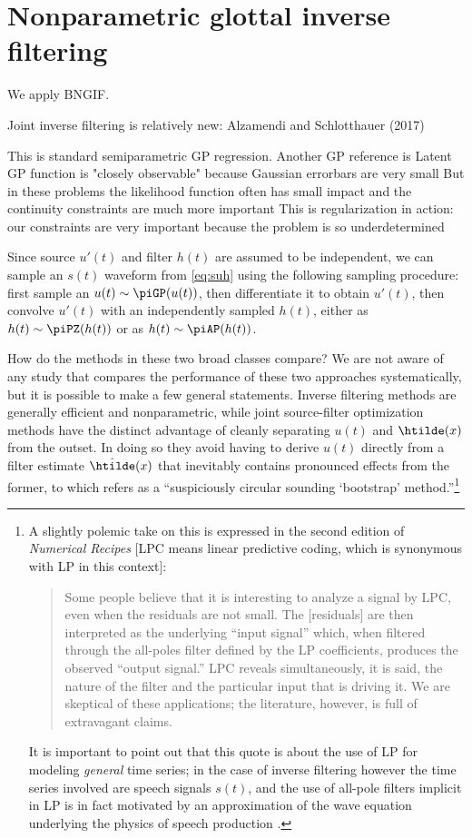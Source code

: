 \chapter{Nonparametric glottal inverse filtering\label{chapter:6}}

\begin{chaptersections}{%
We apply BNGIF.
}

Joint inverse filtering is relatively new: Alzamendi and Schlotthauer (2017)

This is standard semiparametric GP regression.
Another GP reference is \citep{MacKay1998}
Latent GP function is "closely observable" because Gaussian errorbars are very small
But in these problems the likelihood function often has small impact \citep{Murray2010a} and the continuity constraints are much more important
This is regularization in action: our constraints are very important because the problem is so underdetermined


Since source $u'(t)$ and filter $h(t)$ are assumed to be independent, we can sample an $s(t)$ waveform from \eqref{eq:suh} using the following sampling procedure: first sample an $u(t) \sim \piGP(u(t))$, then differentiate it to obtain $u'(t)$, then convolve $u'(t)$ with an independently sampled $h(t)$, either as $h(t) \sim \piPZ(h(t))$ or as $h(t) \sim \piAP(h(t))$.

How do the methods in these two broad classes compare?
We are not aware of any study that compares the performance of these two approaches systematically, but it is possible to make a few general statements.
Inverse filtering methods are generally efficient and nonparametric, while joint source-filter optimization methods have the distinct advantage of cleanly separating $u(t)$ and $\htilde(x)$ from the outset.
In doing so they avoid having to derive $u(t)$ directly from a filter estimate $\hat\htilde(x)$ that inevitably contains pronounced effects from the former, to which \cite[][p.~94]{Schroeder1999} refers as a ``suspiciously circular sounding `bootstrap' method.''\footnote{%
	A slightly polemic take on this is expressed in the second edition of \emph{Numerical Recipes} [LPC means linear predictive coding, which is synonymous with LP in this context]:
	\begin{quote}
		Some people believe that it is interesting to analyze a signal by LPC, even when the residuals are not small.
		The [residuals] are then interpreted as the
		underlying “input signal” which, when filtered through the all-poles filter defined by the LP coefficients, produces the observed ``output signal.'' LPC reveals simultaneously, it is said, the nature of the filter and the particular input that is driving it. We are skeptical of these applications;
		the literature, however, is full of extravagant claims.
		\citep[][p.~572]{Press1992}
	\end{quote}
	It is important to point out that this quote is about the use of LP for modeling \emph{general} time series; in the case of inverse filtering however the time series involved are speech signals $s(t)$, and the use of all-pole filters implicit in LP is in fact motivated by an approximation of the wave equation underlying the physics of speech production \citep{Flanagan1965}.
}



\end{chaptersections}
